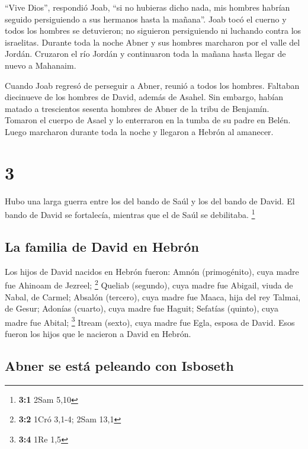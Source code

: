  ``Vive Dios'', respondió Joab, ``si no hubieras dicho
nada, mis hombres habrían seguido persiguiendo a sus hermanos hasta la
mañana''.  Joab tocó el cuerno y todos los hombres se
detuvieron; no siguieron persiguiendo ni luchando contra los israelitas.
 Durante toda la noche Abner y sus hombres marcharon por
el valle del Jordán. Cruzaron el río Jordán y continuaron toda la mañana
hasta llegar de nuevo a Mahanaim.

 Cuando Joab regresó de perseguir a Abner, reunió a todos
los hombres. Faltaban diecinueve de los hombres de David, además de
Asahel.  Sin embargo, habían matado a trescientos sesenta
hombres de Abner de la tribu de Benjamín.  Tomaron el
cuerpo de Asael y lo enterraron en la tumba de su padre en Belén. Luego
marcharon durante toda la noche y llegaron a Hebrón al amanecer.

\hypertarget{section-2}{%
\section{3}\label{section-2}}

 Hubo una larga guerra entre los del bando de Saúl y los
del bando de David. El bando de David se fortalecía, mientras que el de
Saúl se debilitaba. \footnote{\textbf{3:1} 2Sam 5,10}

\hypertarget{la-familia-de-david-en-hebruxf3n}{%
\subsection{La familia de David en
Hebrón}\label{la-familia-de-david-en-hebruxf3n}}

 Los hijos de David nacidos en Hebrón fueron: Amnón
(primogénito), cuya madre fue Ahinoam de Jezreel; \footnote{\textbf{3:2}
  1Cró 3,1-4; 2Sam 13,1}  Queliab (segundo), cuya madre
fue Abigail, viuda de Nabal, de Carmel; Absalón (tercero), cuya madre
fue Maaca, hija del rey Talmai, de Gesur;  Adonías
(cuarto), cuya madre fue Haguit; Sefatías (quinto), cuya madre fue
Abital; \footnote{\textbf{3:4} 1Re 1,5}  Itream (sexto),
cuya madre fue Egla, esposa de David. Esos fueron los hijos que le
nacieron a David en Hebrón.

\hypertarget{abner-se-estuxe1-peleando-con-isboseth}{%
\subsection{Abner se está peleando con
Isboseth}\label{abner-se-estuxe1-peleando-con-isboseth}}

